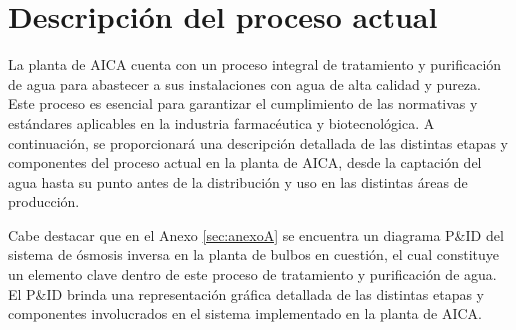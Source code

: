 \section{Descripción del proceso actual}
La planta de AICA cuenta con un proceso integral de tratamiento y purificación de agua para abastecer
a sus instalaciones con agua de alta calidad y pureza. Este proceso es esencial para garantizar
el cumplimiento de las normativas y estándares aplicables en la industria farmacéutica y biotecnológica.
A continuación, se proporcionará una descripción detallada de las distintas etapas y componentes del
proceso actual en la planta de AICA, desde la captación del agua hasta su punto antes de la distribución y uso en las distintas áreas de producción.

Cabe destacar que en el Anexo \ref{sec:anexoA} se encuentra un diagrama
 P\&ID del sistema de ósmosis inversa en la planta de bulbos en cuestión, el cual constituye un 
 elemento clave dentro de este proceso de tratamiento y purificación de agua. 
 El P\&ID brinda una representación gráfica detallada de las distintas etapas 
 y componentes involucrados en el sistema implementado en 
 la planta de AICA.

